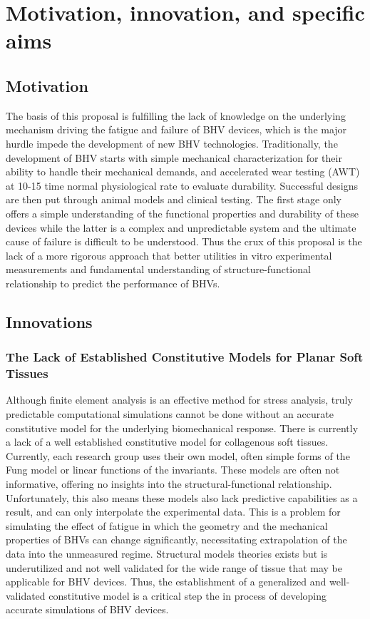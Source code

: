\section{Motivation, innovation, and specific aims}

\subsection{Motivation}
    The basis of this proposal is fulfilling the lack of knowledge on the underlying mechanism driving the fatigue and failure of BHV devices, which is the major hurdle impede the development of new BHV technologies. Traditionally, the development of BHV starts with simple mechanical characterization for their ability to handle their mechanical demands, and accelerated wear testing (AWT) at 10-15 time normal physiological rate to evaluate durability. Successful designs are then put through animal models and clinical testing. The first stage only offers a simple understanding of the functional properties and durability of these devices while the latter is a complex and unpredictable system and the ultimate cause of failure is difficult to be understood. Thus the crux of this proposal is the lack of a more rigorous approach that better utilities in vitro experimental measurements and fundamental understanding of structure-functional relationship to predict the performance of BHVs.

\subsection{Innovations}
\subsubsection{The Lack of Established Constitutive Models for Planar Soft Tissues}
    Although finite element analysis is an effective method for stress analysis, truly predictable computational simulations cannot be done without an accurate constitutive model for the underlying biomechanical response. There is currently a lack of a well established constitutive model for collagenous soft tissues. Currently, each research group uses their own model, often simple forms of the Fung model or linear functions of the invariants. These models are often not informative, offering no insights into the structural-functional relationship. Unfortunately, this also means these models also lack predictive capabilities as a result, and can only interpolate the experimental data. This is a problem for simulating the effect of fatigue in which the geometry and the mechanical properties of BHVs can change significantly, necessitating extrapolation of the data into the unmeasured regime. Structural models theories exists \cite{sacks_incorporation_2003,lanir_structural_1979,driessen_structural_2005} but is underutilized and not well validated for the wide range of tissue that may be applicable for BHV devices. Thus, the establishment of a generalized and well-validated constitutive model is a critical step the in process of developing accurate simulations of BHV devices.

